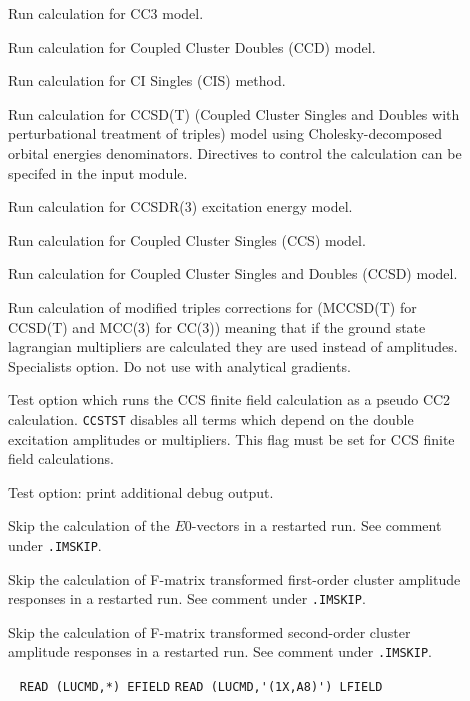 \begin{description}
\item[]     
        Run calculation for CC3 model.
%
\item[]    
        Run calculation for Coupled Cluster Doubles
        (CCD) model. 
%
\item[]    
        Run calculation for CI Singles (CIS) method. 
%
\item[]  
        Run calculation for CCSD(T) (Coupled Cluster Singles and 
        Doubles with perturbational treatment of triples) model
        using Cholesky-decomposed orbital energies denominators.
        Directives to control the calculation can be specifed in the
         input module.
%
\item[] 
        Run calculation for CCSDR(3) excitation energy model.
%
\item[] 
        Run calculation for Coupled Cluster Singles
        (CCS) model. 
%
\item[]   
        Run calculation for Coupled Cluster Singles and Doubles
        (CCSD) model. 
%
%
\item[]   
        Run calculation of modified triples corrections for (MCCSD(T) for CCSD(T) and MCC(3) for CC(3))
        meaning that if the ground state lagrangian multipliers are calculated 
        they are used instead of amplitudes. Specialists option. 
        Do not use with analytical gradients. 
%
\item[] 
   Test option which runs the CCS finite field calculation as a pseudo CC2
   calculation. \verb+CCSTST+ disables all terms which depend on the
   double excitation amplitudes or multipliers. This flag must be
   set for CCS finite field calculations.
%
\item[]  
   Test option: print additional debug output.
%
\item[] 
   Skip the calculation of the $E0$-vectors 
   in a restarted run. See comment under \verb|.IMSKIP|.
%
\item[] 
   Skip the calculation of F-matrix transformed first-order
   cluster amplitude responses in a restarted run. See comment under \verb|.IMSKIP|.
%
\item[] 
   Skip the calculation of F-matrix transformed second-order
   cluster amplitude responses in a restarted run. See comment under \verb|.IMSKIP|.
%
\item[] \verb| |\newline
    \verb|READ (LUCMD,*) EFIELD|\newline
    \verb|READ (LUCMD,'(1X,A8)') LFIELD|


\end{description}
